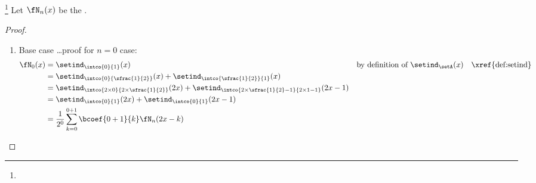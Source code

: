 \begin{theorem}
\footnote{
  }
\label{thm:bspline_2x}
Let $\fN_n(x)$ be the . %
\end{theorem}
\begin{proof}
\begin{enumerate}
  \item Base case \ldots proof for $n=0$ case:
    \begin{align*}
      \fN_0(x)
        &= \setind_\intco{0}{1}(x)
        && \text{by definition of $\setind_\setA(x)$}
        && \text{\xref{def:setind}}
      \\&= \setind_\intco{0}{\sfrac{1}{2}}(x) + \setind_\intco{\sfrac{1}{2}}{1}(x)
      \\&= \setind_\intco{2\times0}{2\times\sfrac{1}{2}}(2x) + \setind_\intco{2\times\sfrac{1}{2}-1}{2\times1-1}(2x-1)
      \\&= \setind_\intco{0}{1}(2x) + \setind_\intco{0}{1}(2x-1)
      \\&= \frac{1}{2^0}\sum_{k=0}^{0+1} \bcoef{0+1}{k} \fN_n(2x-k)
    \end{align*}


\end{enumerate}
\end{proof}
